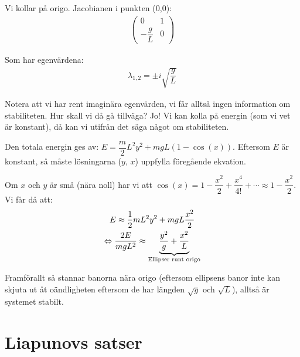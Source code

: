 \noindent Vi kollar på origo. Jacobianen i punkten (0,0):
\begin{equation*}
  \begin{gathered}
    \begin{pmatrix}0&1\\-\dfrac{g}{L}&0\end{pmatrix}
  \end{gathered}
\end{equation*}\par
\noindent Som har egenvärdena:
\begin{equation*}
  \begin{gathered}
    \lambda_{1,2}=\pm i\sqrt{\dfrac{g}{L}}
  \end{gathered}
\end{equation*}\par\bigskip
\noindent Notera att vi har rent imaginära egenvärden, vi får alltså ingen information om stabiliteten. Hur skall vi då gå tillväga? Jo! Vi kan kolla på energin (som vi vet är konstant), då kan vi utifrån det säga något om stabiliteten.
\par\bigskip
\noindent Den totala energin ges av: $E=\dfrac{m}{2}L^2y^2+mgL(1-\cos(x))$. Eftersom $E$ är konstant, så måste lösningarna ($y$, $x$) uppfylla föregående ekvation.
\par
\noindent Om $x$ och $y$ är små (nära noll) har vi att $\cos(x)=1-\dfrac{x^2}{2}+\dfrac{x^4}{4!}+\cdots\approx 1-\dfrac{x^2}{2}$. Vi får då att:
\begin{equation*}
  \begin{gathered}
    E\approx\dfrac{1}{2}mL^2y^2+mgL\dfrac{x^2}{2}\\
    \Leftrightarrow \dfrac{2E}{mgL^2}\approx \underbrace{\dfrac{y^2}{g}+\dfrac{x^2}{L}
}_{\text{Ellipser runt origo}}
  \end{gathered}
\end{equation*}\par
\noindent Framförallt så stannar banorna nära origo (eftersom ellipsens banor inte kan skjuta ut åt oändligheten eftersom de har längden $\sqrt{g}$ och $\sqrt{L}$), alltså är systemet stabilt.
\newpage
\section{Liapunovs satser}\hfill\\
\par\bigskip
